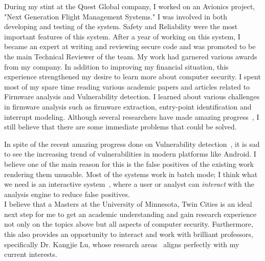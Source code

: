 \documentclass{article}
\begin{document}
During my stint at the Quest Global company, I worked on an Avionics project, "Next Generation Flight Management Systems." I was involved in both developing and testing of the system. Safety and Reliability were the most important features of this system. After a year of working
 on this system, I became an expert at writing and reviewing secure code and was promoted to be the main Technical Reviewer of the team. My work had garnered various awards from my company. In addition to improving my financial situation, this experience strengthened my desire to learn more about computer security. I spent most of my spare time reading various academic papers and articles related to Firmware analysis and Vulnerability detection. I learned about various challenges in firmware analysis such as firmware extraction, entry-point identification and interrupt modeling. Although several researchers have made amazing progress~\cite{zaddach2014avatar, shoshitaishvili2015firmalice, costin2014large}, I still believe that there are some immediate problems that could be solved.

In spite of the recent amazing progress done on Vulnerability detection~\cite{machiry2017dr, redini2017bootstomp}, it is sad to see the increasing trend of vulnerabilities in modern platforms like Android. I believe one of the main reason for this is the false positives of the existing work rendering them unusable. Most of the systems work in batch mode; I think what we need is an interactive system~\cite{Mangal:2015:UAP:2786805.2786851}, where a user or analyst can \emph{interact} with the analysis engine to reduce false positives.\\

I believe that a Masters at the University of Minnesota, Twin Cities is an ideal next step for me to get an academic understanding and gain research experience not only on the topics above but all aspects of computer security. Furthermore, this also provides an opportunity to interact and work with brilliant professors, specifically Dr. Kangjie Lu, whose research areas~\cite{lu2018stopping, lu2017unleashing} aligns perfectly with my current interests.

\medskip

{}

\end{document}
